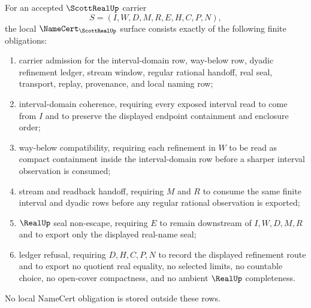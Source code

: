 \begin{theorem}
\label{thm:scott-real-namecert-obligations}
For an accepted $\ScottRealUp$ carrier
$$
S=(I,W,D,M,R,E,H,C,P,N),
$$
the local $\NameCert_{\ScottRealUp}$ surface consists exactly of the following finite obligations:
\begin{enumerate}
\item carrier admission for the interval-domain row, way-below row, dyadic refinement ledger, stream window, regular rational handoff, real seal, transport, replay, provenance, and local naming row;
\item interval-domain coherence, requiring every exposed interval read to come from $I$ and to preserve the displayed endpoint containment and enclosure order;
\item way-below compatibility, requiring each refinement in $W$ to be read as compact containment inside the interval-domain row before a sharper interval observation is consumed;
\item stream and readback handoff, requiring $M$ and $R$ to consume the same finite interval and dyadic rows before any regular rational observation is exported;
\item $\RealUp$ seal non-escape, requiring $E$ to remain downstream of $I,W,D,M,R$ and to export only the displayed real-name seal;
\item ledger refusal, requiring $D,H,C,P,N$ to record the displayed refinement route and to export no quotient real equality, no selected limits, no countable choice, no open-cover compactness, and no ambient $\RealUp$ completeness.
\end{enumerate}
No local NameCert obligation is stored outside these rows.
\end{theorem}

